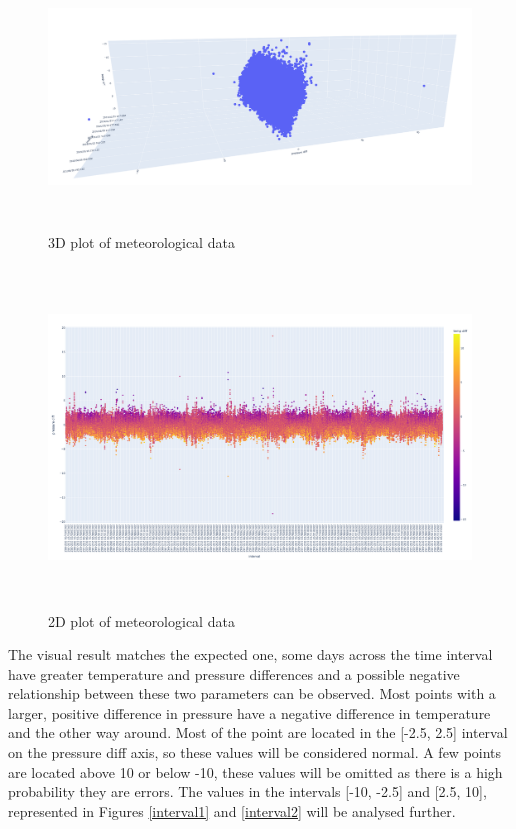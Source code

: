 \documentclass{article}
\begin{document}
\begin{figure}[ht] 
\centering
\includegraphics[height=7cm]{3dPlot.png} 
\caption{3D plot of meteorological data}
\label{figure3D}
\end{figure}

\begin{figure}[h!] 
\centering
\includegraphics[height=9cm]{newplot (1).png}
\caption{2D plot of meteorological data} 
\label{figure2DColor}
\end{figure}

\newpage

The visual result matches the expected one, some days across the time interval have greater temperature and pressure differences and a possible negative relationship between these two parameters can be observed. Most points with a larger, positive difference in pressure have a negative difference in temperature and the other way around. Most of the point are located in the [-2.5, 2.5] interval on the pressure diff axis, so these values will be considered normal. A few points are located above 10 or below -10, these values will be omitted as there is a high probability they are errors. The values in the intervals [-10, -2.5] and [2.5, 10], represented in Figures \ref{interval1} and \ref{interval2} will be analysed further.
\end{document}
